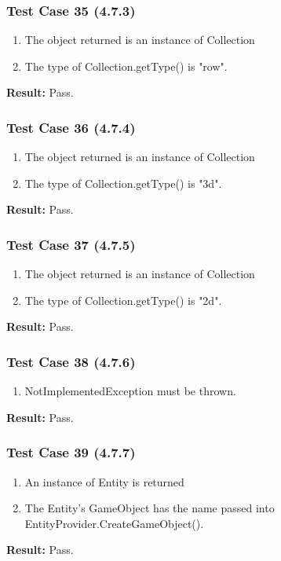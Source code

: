 \documentclass[a4paper,12pt]{article}
\begin{document}
		\subsubsection{Test Case 35 (4.7.3)}
				\begin{enumerate}
					\item The object returned is an instance of Collection
					\item The type of Collection.getType() is "row".
				\end{enumerate}
			\textbf{Result: }Pass.
		\subsubsection{Test Case 36 (4.7.4)}
				\begin{enumerate}
					\item The object returned is an instance of Collection
					\item The type of Collection.getType() is "3d".
				\end{enumerate}
			\textbf{Result: }Pass.
		\subsubsection{Test Case 37 (4.7.5)}
				\begin{enumerate}
					\item The object returned is an instance of Collection
					\item The type of Collection.getType() is "2d".
				\end{enumerate}
			\textbf{Result: }Pass.
		\subsubsection{Test Case 38 (4.7.6)}
				\begin{enumerate}
					\item NotImplementedException must be thrown.
				\end{enumerate}
			\textbf{Result: }Pass.
		\subsubsection{Test Case 39 (4.7.7)}
				\begin{enumerate}
					\item An instance of Entity is returned
					\item The Entity’s GameObject has the name passed into EntityProvider.CreateGameObject().
				\end{enumerate}
			\textbf{Result: }Pass.
\end{document}
